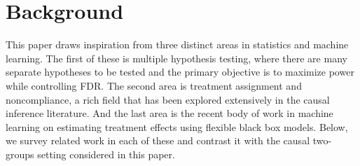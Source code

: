 %
\section{Background}
\label{sec:background}
%
This paper draws inspiration from three distinct areas in statistics and machine learning. The first of these is multiple hypothesis testing, where there are many separate hypotheses to be tested and the primary objective is to maximize power while controlling FDR. The second area is treatment assignment and noncompliance, a rich field that has been explored extensively in the causal inference literature. And the last area is the recent body of work in machine learning on estimating treatment effects using flexible black box models. Below, we survey related work in each of these and contrast it with the causal two-groups setting considered in this paper.

